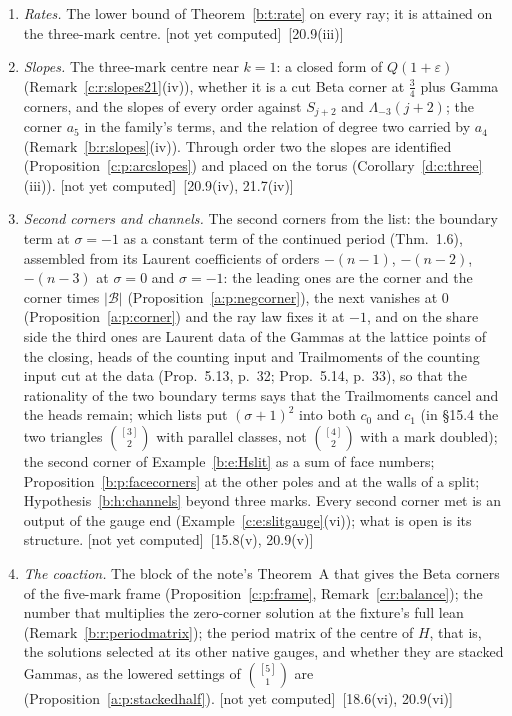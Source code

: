 \documentclass[11pt]{article}
\newcommand{\cB}{\mathcal B}
\theoremstyle{plain}
\theoremstyle{definition}
\theoremstyle{remark}
\newcommand{\notyet}{\textup{[not yet computed]}}
\begin{document}
\begin{enumerate}[label=\textbf{O\arabic*},ref=O\arabic*,leftmargin=*,itemsep=4pt]
\item\label{o:rates} \emph{Rates.} The lower bound of Theorem~\ref{b:t:rate} on every ray; it is attained on the three-mark centre. \notyet\ {\small[20.9(iii)]}
\item\label{o:slopes} \emph{Slopes.} The three-mark centre near $k=1$: a closed form of $Q(1+\varepsilon)$ (Remark~\ref{c:r:slopes21}(iv)), whether it is a cut Beta corner at $\frac34$ plus Gamma corners, and the slopes of every order against $S_{j+2}$ and $\Lambda_{-3}(j+2)$; the corner $a_5$ in the family's terms, and the relation of degree two carried by $a_4$ (Remark~\ref{b:r:slopes}(iv)). Through order two the slopes are identified (Proposition~\ref{c:p:arcslopes}) and placed on the torus (Corollary~\ref{d:c:three}(iii)). \notyet\ {\small[20.9(iv), 21.7(iv)]}
\item\label{o:corners} \emph{Second corners and channels.} The second corners from the list: the boundary term at $\sigma=-1$ as a constant term of the continued period (Thm.~1.6), assembled from its Laurent coefficients of orders $-(n-1)$, $-(n-2)$, $-(n-3)$ at $\sigma=0$ and $\sigma=-1$: the leading ones are the corner and the corner times $|\cB|$ (Proposition~\ref{a:p:negcorner}), the next vanishes at $0$ (Proposition~\ref{a:p:corner}) and the ray law fixes it at $-1$, and on the share side the third ones are Laurent data of the Gammas at the lattice points of the closing, heads of the counting input and Trailmoments of the counting input cut at the data (Prop.~5.13, p.~32; Prop.~5.14, p.~33), so that the rationality of the two boundary terms says that the Trailmoments cancel and the heads remain; which lists put $(\sigma+1)^2$ into both $c_0$ and $c_1$ (in \S15.4 the two triangles $\binom{[3]}2$ with parallel classes, not $\binom{[4]}2$ with a mark doubled); the second corner of Example~\ref{b:e:Hslit} as a sum of face numbers; Proposition~\ref{b:p:facecorners} at the other poles and at the walls of a split; Hypothesis~\ref{b:h:channels} beyond three marks. Every second corner met is an output of the gauge end (Example~\ref{c:e:slitgauge}(vi)); what is open is its structure. \notyet\ {\small[15.8(v), 20.9(v)]}
\item\label{o:coaction} \emph{The coaction.} The block of the note's Theorem~A that gives the Beta corners of the five-mark frame (Proposition~\ref{c:p:frame}, Remark~\ref{c:r:balance}); the number that multiplies the zero-corner solution at the fixture's full lean (Remark~\ref{b:r:periodmatrix}); the period matrix of the centre of $H$, that is, the solutions selected at its other native gauges, and whether they are stacked Gammas, as the lowered settings of $\binom{[5]}1$ are (Proposition~\ref{a:p:stackedhalf}). \notyet\ {\small[18.6(vi), 20.9(vi)]}

\end{enumerate}
\end{document}
